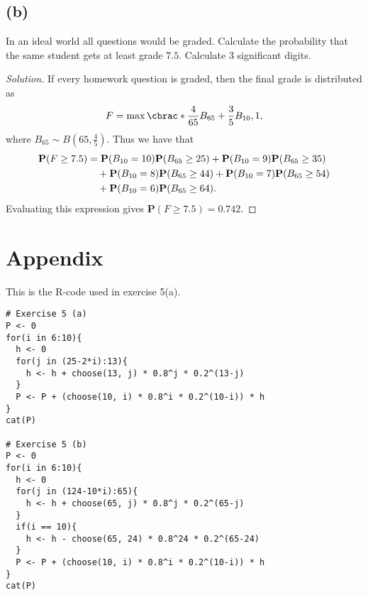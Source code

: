 \documentclass[10pt, a4paper, twoside]{amsart}
\DeclarePairedDelimiter\cbrac\{\}
\renewcommand{\P}{\ensuremath{\mathbf{P}}}
\newenvironment{solution}
               {\let\oldqedsymbol=\qedsymbol
                \renewcommand{\qedsymbol}{$\blacktriangleleft$}
                \begin{proof}[Solution]}
               {\end{proof}
                \renewcommand{\qedsymbol}{\oldqedsymbol}}
\begin{document}
\subsection*{(b)}
In an ideal world all questions would be graded. Calculate the probability 
that the same student gets at least grade $7.5$. Calculate $3$
significant digits.
\begin{solution}
 

If every homework question is graded, then the final grade is distributed as
\begin{equation*}
F=\max\cbrac*{\frac{4}{65}B_{65}+\frac{3}{5}B_{10},1}, 
\end{equation*}
where $B_{65}\sim B(65, \tfrac{4}{5})$.
Thus we have that 
\begin{equation}\label{eq:prob_b}
\begin{aligned}
  \P(F \geq 7.5)&=\P(B_{10} = 10)\P(B_{65} \geq 25)+\P(B_{10} = 9)\P(B_{65} \geq 35) \\
 & \hspace{1 em} +\P(B_{10} = 8)\P(B_{65} \geq 44)+\P(B_{10} = 7)\P(B_{65} \geq 54) \\
 & \hspace{1 em} +\P(B_{10} = 6)\P(B_{65} \geq 64).
 \end{aligned}
\end{equation}
Evaluating this expression gives $\P(F \geq 7.5)=0.742$.
\end{solution}


\section*{Appendix}
This is the R-code used in exercise 5(a).
\begin{verbatim}
# Exercise 5 (a)
P <- 0
for(i in 6:10){
  h <- 0
  for(j in (25-2*i):13){
    h <- h + choose(13, j) * 0.8^j * 0.2^(13-j)
  }
  P <- P + (choose(10, i) * 0.8^i * 0.2^(10-i)) * h
}
cat(P)

# Exercise 5 (b)
P <- 0
for(i in 6:10){
  h <- 0
  for(j in (124-10*i):65){
    h <- h + choose(65, j) * 0.8^j * 0.2^(65-j)
  }
  if(i == 10){
    h <- h - choose(65, 24) * 0.8^24 * 0.2^(65-24)
  }
  P <- P + (choose(10, i) * 0.8^i * 0.2^(10-i)) * h
}
cat(P)
\end{verbatim}
\end{document}

